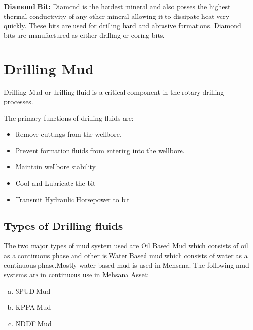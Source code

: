 \textbf{Diamond Bit:} Diamond is the hardest mineral and also posses the highest thermal conductivity 
of any other mineral allowing it to dissipate heat very quickly. 
These bits are used for drilling hard and
abrasive formations. Diamond bits are manufactured as either drilling or coring bits.



\section{Drilling Mud}
	
Drilling Mud or drilling fluid is a critical component in the rotary drilling processes.

The primary functions of drilling fluids are:

\begin{itemize}

\item Remove cuttings from the wellbore.
\item Prevent formation fluids from entering into the wellbore.
\item Maintain wellbore stability
\item Cool and Lubricate the bit
\item Transmit Hydraulic Horsepower to bit

\end{itemize}

\subsection*{Types of Drilling fluids}

The two major types of mud system used are Oil Based Mud which consists of oil 
as a continuous phase and other is Water Based mud which consists of water as 
a continuous phase.Mostly water based mud is used in Mehsana. The following 
mud systems are in continuous use in Mehsana Asset:

\begin{enumerate}[(a)]

\item SPUD Mud
\item KPPA Mud
\item NDDF Mud

\end{enumerate}

